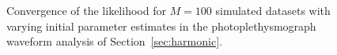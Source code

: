  \begin{figure}[htbp]%
    \centering%
    \caption{Convergence of the likelihood for $M=100$ simulated datasets
    with varying initial parameter estimates in the photoplethysmograph waveform
    analysis of Section~\ref{sec:harmonic}.%
    }\label{fig:harmonic_lh}
 \end{figure}
 
